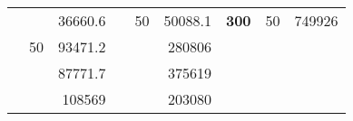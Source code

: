 \begin{table}[H]
\begin{tabular}{|ccrccrccc}
\rowcolor[HTML]{DDFDFF} 
\multicolumn{1}{|c|}{\cellcolor[HTML]{FFFFC7}}                                & \multicolumn{1}{c|}{\cellcolor[HTML]{DDFDFF}}                      & \multicolumn{1}{r|}{\cellcolor[HTML]{DAE8FC}36660.6}   & \multicolumn{1}{c|}{\cellcolor[HTML]{FFFFC7}}                                & \multicolumn{1}{c|}{\multirow{-10}{*}{\cellcolor[HTML]{DDFDFF}50}}  & \multicolumn{1}{r|}{\cellcolor[HTML]{DDFDFF}50088.1}   & \multicolumn{1}{c|}{\multirow{-19}{*}{\cellcolor[HTML]{FFFFC7}\textbf{300}}} & \multicolumn{1}{c|}{\multirow{-10}{*}{\cellcolor[HTML]{DDFDFF}50}} & \multicolumn{1}{r|}{\cellcolor[HTML]{DDFDFF}749926}    \\ \cline{3-3} \cline{5-9} 
\multicolumn{1}{|c|}{\cellcolor[HTML]{FFFFC7}}                                & \multicolumn{1}{c|}{\multirow{-10}{*}{\cellcolor[HTML]{DDFDFF}50}} & \multicolumn{1}{r|}{\cellcolor[HTML]{DDFDFF}93471.2}   & \multicolumn{1}{c|}{\cellcolor[HTML]{FFFFC7}}                                & \multicolumn{1}{c|}{\cellcolor[HTML]{DAE8FC}}                       & \multicolumn{1}{r|}{\cellcolor[HTML]{DAE8FC}280806}    &                                                                              &                                                                    &                                                        \\ \cline{2-3} \cline{6-6}
\multicolumn{1}{|c|}{\cellcolor[HTML]{FFFFC7}}                                & \multicolumn{1}{c|}{\cellcolor[HTML]{DAE8FC}}                      & \multicolumn{1}{r|}{\cellcolor[HTML]{DAE8FC}87771.7}   & \multicolumn{1}{c|}{\cellcolor[HTML]{FFFFC7}}                                & \multicolumn{1}{c|}{\cellcolor[HTML]{DAE8FC}}                       & \multicolumn{1}{r|}{\cellcolor[HTML]{DDFDFF}375619}    &                                                                              &                                                                    &                                                        \\ \cline{3-3} \cline{6-6}
\multicolumn{1}{|c|}{\cellcolor[HTML]{FFFFC7}}                                & \multicolumn{1}{c|}{\cellcolor[HTML]{DAE8FC}}                      & \multicolumn{1}{r|}{\cellcolor[HTML]{DDFDFF}108569}    & \multicolumn{1}{c|}{\cellcolor[HTML]{FFFFC7}}                                & \multicolumn{1}{c|}{\cellcolor[HTML]{DAE8FC}}                       & \multicolumn{1}{r|}{\cellcolor[HTML]{DAE8FC}203080}    &                                                                              &                                                                    &                                                        \\ \cline{3-3} \cline{6-6}

\end{tabular}
\end{table}

